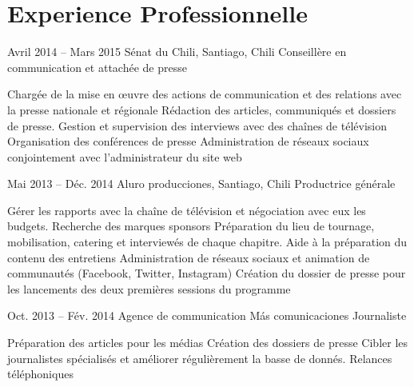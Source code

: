 \documentclass{tccv}
\begin{document}
\pagebreak
\begin{minipage}{0.69\textwidth} 
\section{Experience Professionnelle}

\begin{eventlist}

\item{Avril 2014 -- Mars 2015}
     {Sénat du Chili, Santiago, Chili}
     {Conseillère en communication et attachée de presse}

    \begin{itemize}
      \setlength\itemsep{0cm} 
      \cvitem[\checkmark] Chargée de la mise en œuvre des actions de communication et des relations avec la presse nationale et régionale
      \cvitem[\checkmark] Rédaction des articles, communiqués et dossiers de presse. Gestion et supervision des interviews avec des chaînes de télévision
      \cvitem[\checkmark] Organisation des conférences de presse
      \cvitem[\checkmark] Administration de réseaux sociaux conjointement avec l’administrateur du site web
    \end{itemize}     
     


\item{Mai 2013 -- Déc. 2014}
     {Aluro producciones, Santiago, Chili}
     {Productrice générale}
    
    \begin{itemize}
      \setlength\itemsep{0cm} 
      \cvitem[\checkmark] Gérer les rapports avec la chaîne de télévision et négociation avec eux les budgets. Recherche des marques sponsors
      \cvitem[\checkmark] Préparation du lieu de tournage, mobilisation, catering et interviewés de chaque chapitre. Aide à la préparation du contenu des entretiens
      \cvitem[\checkmark] Administration de réseaux sociaux et animation de communautés (Facebook, Twitter, Instagram)
      \cvitem[\checkmark] Création du dossier de presse pour les lancements des deux premières sessions du programme

    \end{itemize}     

\item{Oct. 2013 -- Fév. 2014 }     
  {Agence de communication Más comunicaciones}     
  {Journaliste}

\begin{itemize}
      \setlength\itemsep{0cm} 
      \cvitem[\checkmark] Préparation des articles pour les médias
      \cvitem[\checkmark] Création des dossiers de presse 
      \cvitem[\checkmark] Cibler les journalistes spécialisés et améliorer régulièrement la basse de donnés. 
      \cvitem[\checkmark] Relances téléphoniques
\end{itemize}       




\end{eventlist}
\end{minipage}
\end{document}

